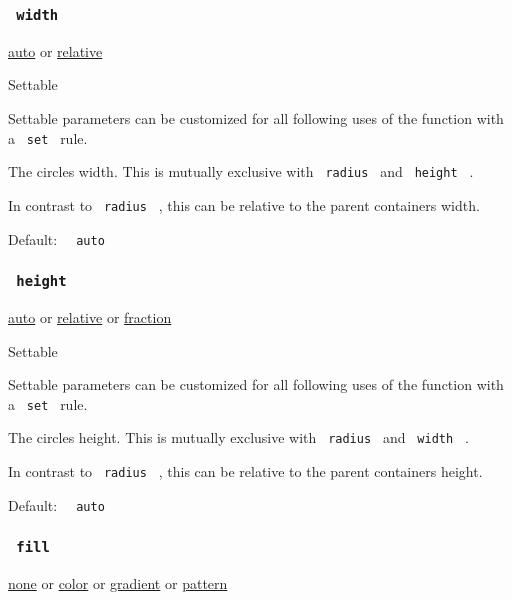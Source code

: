 \subsubsection{\texorpdfstring{\texttt{\ width\ }}{ width }}\label{parameters-width}

\href{/docs/reference/foundations/auto/}{auto} {or}
\href{/docs/reference/layout/relative/}{relative}

{{ Settable }}

\label{parameters-width-settable-tooltip}
Settable parameters can be customized for all following uses of the
function with a \texttt{\ set\ } rule.

The circle\textquotesingle s width. This is mutually exclusive with
\texttt{\ radius\ } and \texttt{\ height\ } .

In contrast to \texttt{\ radius\ } , this can be relative to the parent
container\textquotesingle s width.

Default: \texttt{\ }{\texttt{\ auto\ }}\texttt{\ }

\subsubsection{\texorpdfstring{\texttt{\ height\ }}{ height }}\label{parameters-height}

\href{/docs/reference/foundations/auto/}{auto} {or}
\href{/docs/reference/layout/relative/}{relative} {or}
\href{/docs/reference/layout/fraction/}{fraction}

{{ Settable }}

\label{parameters-height-settable-tooltip}
Settable parameters can be customized for all following uses of the
function with a \texttt{\ set\ } rule.

The circle\textquotesingle s height. This is mutually exclusive with
\texttt{\ radius\ } and \texttt{\ width\ } .

In contrast to \texttt{\ radius\ } , this can be relative to the parent
container\textquotesingle s height.

Default: \texttt{\ }{\texttt{\ auto\ }}\texttt{\ }

\subsubsection{\texorpdfstring{\texttt{\ fill\ }}{ fill }}\label{parameters-fill}

\href{/docs/reference/foundations/none/}{none} {or}
\href{/docs/reference/visualize/color/}{color} {or}
\href{/docs/reference/visualize/gradient/}{gradient} {or}
\href{/docs/reference/visualize/pattern/}{pattern}

